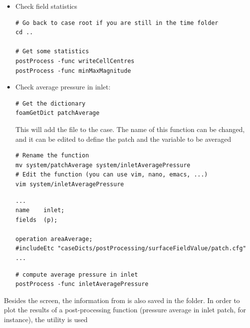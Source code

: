 \documentclass[
    parskip=half,      %
    DIV=12,            %
    headings=normal,   %
    fontsize=11pt,     %
    english            %
]{scrartcl}
\begin{document}
\begin{itemize}
	\item Check field statistics



\begin{lstlisting}[style=terminal]
# Go back to case root if you are still in the time folder
cd ..

# Get some statistics
postProcess -func writeCellCentres
postProcess -func minMaxMagnitude
\end{lstlisting}

\item Check average pressure in inlet:

\begin{lstlisting}[style=terminal]
# Get the dictionary 
foamGetDict patchAverage
\end{lstlisting}

This will add the file  to the case. The name of this function can be changed, and it can be edited to define the patch and the variable to be averaged

\begin{lstlisting}[style=terminal]
# Rename the function 
mv system/patchAverage system/inletAveragePressure
# Edit the function (you can use vim, nano, emacs, ...)
vim system/inletAveragePressure
\end{lstlisting}

\begin{lstlisting}[style=output]
...
name    inlet;
fields  (p);

operation areaAverage;
#includeEtc "caseDicts/postProcessing/surfaceFieldValue/patch.cfg"
...
\end{lstlisting}

\begin{lstlisting}[style=terminal]
# compute average pressure in inlet 
postProcess -func inletAveragePressure
\end{lstlisting}

\end{itemize}


Besides the screen, the information from  is also saved in the 
 folder. In order to plot the results of a post-processing 
function (pressure average in inlet patch, for instance), the utility 
 is used
\end{document}
